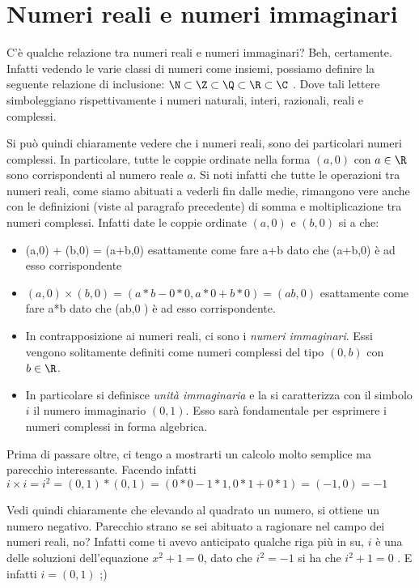 \section{Numeri reali e numeri immaginari}
C'è qualche relazione tra numeri reali e numeri immaginari? Beh, certamente. Infatti vedendo le varie classi di numeri come insiemi, possiamo definire la seguente relazione di inclusione: $ \N \subset \Z \subset \Q \subset \R \subset \C $ . Dove tali lettere simboleggiano rispettivamente i numeri naturali, interi, razionali, reali e complessi.

Si può quindi chiaramente vedere che i numeri reali, sono dei particolari numeri complessi. In particolare, tutte le coppie ordinate nella forma $ (a, 0) $ con $ a\in \R $ sono corrispondenti al numero reale $ a $. Si noti infatti che tutte le operazioni tra numeri reali, come siamo abituati a vederli fin dalle medie, rimangono vere anche con le definizioni (viste al paragrafo precedente) di somma e moltiplicazione tra numeri complessi. Infatti date le coppie ordinate $ (a,0) $ e $ (b,0) $ si a che:
\begin{itemize}
	\item (a,0) + (b,0) = (a+b,0) esattamente come fare a+b dato che (a+b,0) è ad esso corrispondente
	\item $ (a,0) \times (b,0) = (a*b - 0*0, a*0 + b*0) = (ab,0) $ esattamente come fare a*b dato che (ab,0 ) è ad esso corrispondente.
	\item In contrapposizione ai numeri reali, ci sono i \emph{numeri immaginari}. Essi vengono solitamente definiti come numeri complessi del tipo $ (0,b) $ con $ b\in\R $.
	\item In particolare si definisce \emph{unità immaginaria } e la si caratterizza con il simbolo $ i $ il numero immaginario $ (0,1) $. Esso sarà fondamentale per esprimere i numeri complessi in forma algebrica.
\end{itemize}

Prima di passare oltre, ci tengo a mostrarti un calcolo molto semplice ma parecchio interessante. Facendo infatti $ i \times i = i^2 = (0,1)*(0,1) =(0*0-1*1,0*1 + 0*1) = (-1,0) = -1 $

Vedi quindi chiaramente che elevando al quadrato un numero, si ottiene un numero negativo. Parecchio strano se sei abituato a ragionare nel campo dei numeri reali, no? Infatti come ti avevo anticipato qualche riga più in su, $ i $ è una delle soluzioni dell'equazione $ x^2+1=0 $, dato che $ i^2 = -1 $ si ha che $ i^2+1=0 $ . E infatti $ i = (0,1) $ ;)

